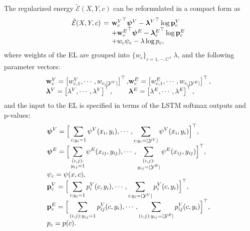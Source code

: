 \documentclass[10pt,twocolumn,letterpaper]{article}
\begin{document}
The regularized energy $\tilde{\mathcal{E}}(X,Y, c)$ can be reformulated in a compact form as%
\begin{equation}
\setlength{\arraycolsep}{2pt}
\begin{array}{lcl}
 \tilde{\mathcal{E}}(X,Y, c) &=& {\ob_c^V}^\top\psib^V - {\lb^V}^\top \log\pb_c^V \\
 &&+ {\ob_c^E}^\top\psib^E - {\lb_c^E}^\top \log\pb_c^E \\
 &&+w_c\psi_c - \lambda\log p_c,
\end{array}
\label{eq:energy_c}
\end{equation}
where weights of the EL are grouped into $\{w_c\}_{c =1,\cdots,C}$, $\lambda$, and the following parameter vectors:
\begin{equation}
\setlength{\arraycolsep}{0pt}
\begin{array}{ll}
\ob_c^V = \left[w_{c,1}^V, \cdots, w_{c,|\mathcal{Y}^V|}\right]^\top,&
\ob_c^E = \left[w_{c,1}^E, \cdots, w_{c,|\mathcal{Y}^E|}\right]^\top,\\
\lb^V = \left[\lambda^V, \cdots, \lambda^V\right]^\top,&
\lb^E = \left[\lambda^E, \cdots, \lambda^E\right]^\top,
\end{array}
\label{eq:parameters}
\end{equation}
and the input to the EL is specified in terms of the LSTM softmax outputs and p-values:
\begin{equation}
\setlength{\arraycolsep}{0pt}
\begin{array}{l}
\displaystyle
\psib^V = \Big[\sum_{i : y_i = 1} \psi^V(x_i, y_i), \cdots, \sum_{i:y_i = |\mathcal{Y}^V|} \psi^V(x_i, y_i)\Big]^\top,\\
\displaystyle
\psib^E=  \Big[\sum_{\substack{(i,j):\\y_{ij} = 1}} \psi^E(x_{ij}, y_{ij}), \cdots, \sum_{\substack{(i,j):\\y_{ij} = |\mathcal{Y}^E|}} \psi^E(x_{ij}, y_{ij})\Big]^\top,\\\displaystyle
\psi_c = \psi(x, c),\\\displaystyle
\pb_c^V = \Big[\sum_{i : y_i = 1} p_i^V(c, y_i), \cdots, \sum_{i: y_i = |\mathcal{Y}^V|} p_i^V(c, y_i)\Big]^\top,\\\displaystyle
\pb_c^E = \Big[\sum_{(i,j) : y_{ij} = 1} p_{ij}^V(c, y_i), \cdots, \sum_{(i,j): y_{ij} = |\mathcal{Y}^E|} p_{ij}^V(c, y_i)\Big]^\top,\\
p_c = p(c).
\end{array}
\end{equation}
\end{document}
